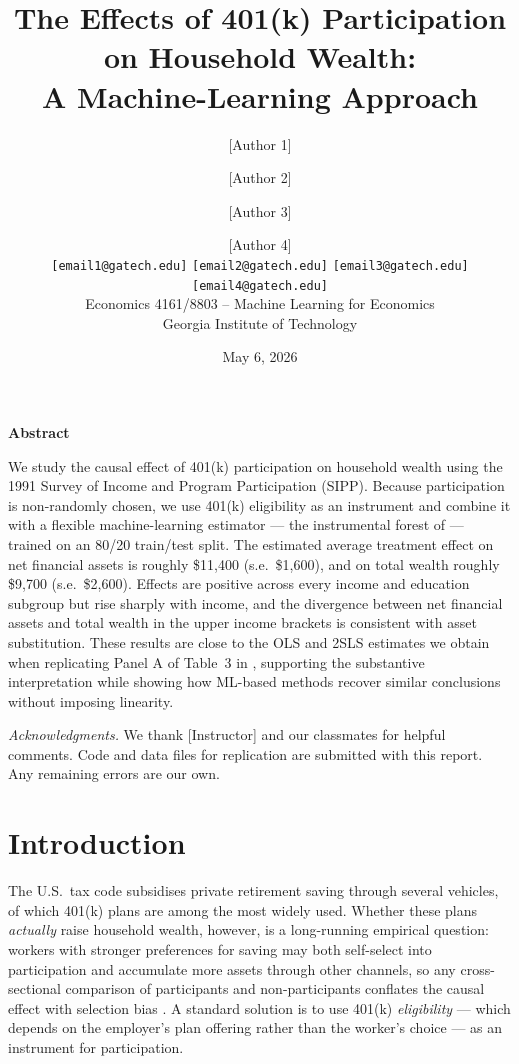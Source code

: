 \documentclass[11pt]{article}
\title{\vspace{-1.5cm}\textbf{The Effects of 401(k) Participation on Household Wealth:\\
A Machine-Learning Approach}}
\author{%
  [Author 1] \and [Author 2] \and [Author 3] \and [Author 4] \\[2pt]
  \small \texttt{[email1@gatech.edu]} \quad
         \texttt{[email2@gatech.edu]} \quad
         \texttt{[email3@gatech.edu]} \quad
         \texttt{[email4@gatech.edu]}\\[6pt]
  \small Economics 4161/8803 -- Machine Learning for Economics \\
  \small Georgia Institute of Technology
}
\date{May 6, 2026}
\begin{document}
\begin{titlepage}
  \maketitle
  \thispagestyle{empty}
  \vspace{0.5cm}

  \begin{center}
    \textbf{Abstract}
  \end{center}

  \noindent
  We study the causal effect of 401(k) participation on household wealth using
  the 1991 Survey of Income and Program Participation (SIPP).  Because
  participation is non-randomly chosen, we use 401(k) eligibility as an
  instrument and combine it with a flexible machine-learning estimator --- the
  instrumental forest of \cite{athey2019grf} --- trained on an 80/20
  train/test split.  The estimated average treatment effect on net financial
  assets is roughly \$11{,}400 (s.e.\ \$1{,}600), and on total wealth roughly
  \$9{,}700 (s.e.\ \$2{,}600).  Effects are positive across every income and
  education subgroup but rise sharply with income, and the divergence between
  net financial assets and total wealth in the upper income brackets is
  consistent with asset substitution.  These results are close to the OLS and
  2SLS estimates we obtain when replicating Panel A of Table~3 in
  \cite{ch2004}, supporting the substantive interpretation while showing how
  ML-based methods recover similar conclusions without imposing linearity.

  \vfill

  \noindent
  \textit{Acknowledgments.}  We thank [Instructor] and our classmates for
  helpful comments.  Code and data files for replication are submitted with
  this report.  Any remaining errors are our own.
\end{titlepage}

\setcounter{page}{1}

\section{Introduction}

The U.S.\ tax code subsidises private retirement saving through several
vehicles, of which 401(k) plans are among the most widely used.  Whether
these plans \emph{actually} raise household wealth, however, is a long-running
empirical question: workers with stronger preferences for saving may both
self-select into participation and accumulate more assets through other
channels, so any cross-sectional comparison of participants and
non-participants conflates the causal effect with selection bias
\citep{ch2004}.  A standard solution is to use 401(k) \emph{eligibility} ---
which depends on the employer's plan offering rather than the worker's
choice --- as an instrument for participation.
\end{document}
